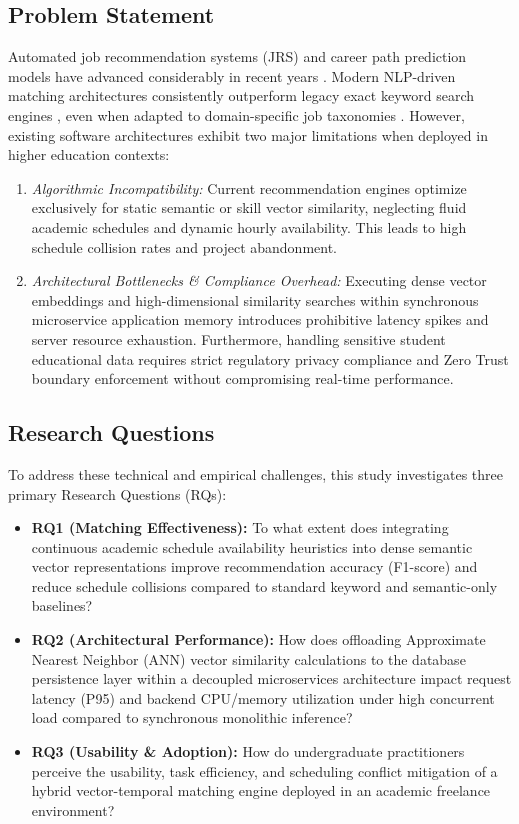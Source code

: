 \documentclass[a4paper,fleqn]{cas-dc}
\begin{document}
\subsection{Problem Statement}
Automated job recommendation systems (JRS) and career path prediction models have advanced considerably in recent years \cite{song2022}. Modern NLP-driven matching architectures consistently outperform legacy exact keyword search engines \cite{alsaif2022}, even when adapted to domain-specific job taxonomies \cite{rebaza2025}. However, existing software architectures exhibit two major limitations when deployed in higher education contexts:
\begin{enumerate}
    \item \textit{Algorithmic Incompatibility:} Current recommendation engines optimize exclusively for static semantic or skill vector similarity, neglecting fluid academic schedules and dynamic hourly availability. This leads to high schedule collision rates and project abandonment.
    \item \textit{Architectural Bottlenecks \& Compliance Overhead:} Executing dense vector embeddings and high-dimensional similarity searches within synchronous microservice application memory introduces prohibitive latency spikes and server resource exhaustion. Furthermore, handling sensitive student educational data requires strict regulatory privacy compliance \cite{ley29733, dl1270} and Zero Trust boundary enforcement \cite{alboqmi2025} without compromising real-time performance.
\end{enumerate}

\subsection{Research Questions}
To address these technical and empirical challenges, this study investigates three primary Research Questions (RQs):
\begin{itemize}
    \item \textbf{RQ1 (Matching Effectiveness):} To what extent does integrating continuous academic schedule availability heuristics into dense semantic vector representations improve recommendation accuracy (F1-score) and reduce schedule collisions compared to standard keyword and semantic-only baselines?
    \item \textbf{RQ2 (Architectural Performance):} How does offloading Approximate Nearest Neighbor (ANN) vector similarity calculations to the database persistence layer within a decoupled microservices architecture impact request latency (P95) and backend CPU/memory utilization under high concurrent load compared to synchronous monolithic inference?
    \item \textbf{RQ3 (Usability \& Adoption):} How do undergraduate practitioners perceive the usability, task efficiency, and scheduling conflict mitigation of a hybrid vector-temporal matching engine deployed in an academic freelance environment?
\end{itemize}
\end{document}
